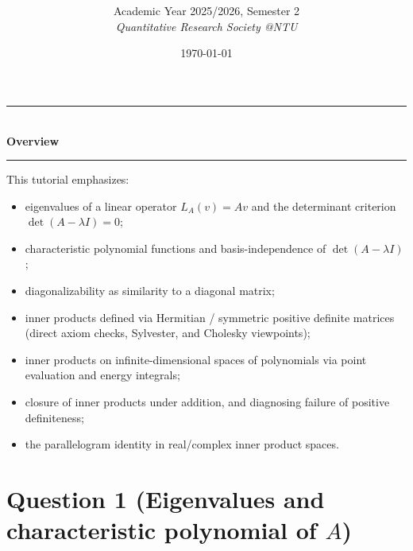 \documentclass[12pt]{article}
\title{
\CourseCode\ \CourseName \\[0.3em]
\large \DocType
}
\author{
  Academic Year 2025/2026, Semester 2 \\[0.25em]
  \textit{Quantitative Research Society @NTU}
}
\date{\today}
\begin{document}
\maketitle
\thispagestyle{plainfirst}
\pagestyle{main}

\begin{center}
  \rule{0.8\textwidth}{0.4pt}\\[4pt]
  \textbf{Overview}\\[2pt]
  \rule{0.8\textwidth}{0.4pt}
\end{center}

\noindent
This tutorial emphasizes:
\begin{itemize}[leftmargin=*]
  \item eigenvalues of a linear operator $L_A(v)=Av$ and the determinant criterion $\det(A-\lambda I)=0$;
  \item characteristic polynomial functions and basis-independence of $\det(A-\lambda I)$;
  \item diagonalizability as similarity to a diagonal matrix;
  \item inner products defined via Hermitian / symmetric positive definite matrices (direct axiom checks, Sylvester, and Cholesky viewpoints);
  \item inner products on infinite-dimensional spaces of polynomials via point evaluation and energy integrals;
  \item closure of inner products under addition, and diagnosing failure of positive definiteness;
  \item the parallelogram identity in real/complex inner product spaces.
\end{itemize}
\newpage
\tableofcontents
\newpage

\section{Question 1 (Eigenvalues and characteristic polynomial of $A$)}
\end{document}
